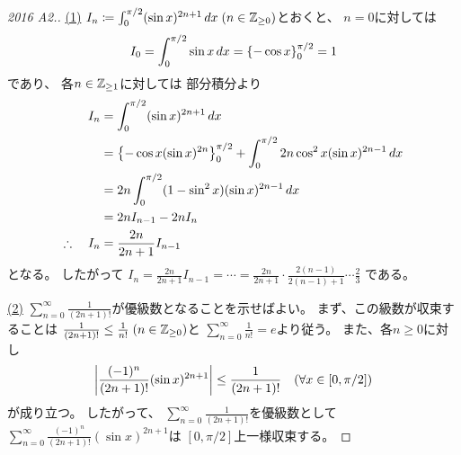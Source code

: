 \documentclass[report]{jlreq}
\begin{document}
\begin{proof}[2016 A2.]
    \uline{(1)} \quad
    $I_n \coloneqq \int_0^{\pi / 2} (\sin x)^{2n + 1} \, dx \; (n \in \mathbb{Z}_{\ge 0})$とおくと、
    $n = 0$に対しては
    \begin{equation}
        I_0 = \int_0^{\pi / 2} \sin x \, dx
            = \left\{{ - \cos x }\right\}_0^{\pi / 2}
            = 1
    \end{equation}
    であり、
    各$n \in \mathbb{Z}_{\ge 1}$に対しては
    部分積分より
    \begin{alignat}{1}
        I_n
            &=
                \int_0^{\pi / 2} (\sin x)^{2n + 1} \, dx
                \\
            &=
                \left\{{
                    - \cos x (\sin x)^{2n}
                }\right\}_0^{\pi / 2}
                +
                \int_0^{\pi / 2} 2n \cos^2 x (\sin x)^{2n - 1} \, dx
                \\
            &=
                2n \int_0^{\pi / 2} (1 - \sin^2 x) (\sin x)^{2n - 1} \, dx
                \\
            &=
                2n I_{n - 1} - 2n I_n
                \\
        \therefore \quad
        I_n
            &=
                \frac{2n}{2n + 1} I_{n - 1}
    \end{alignat}
    となる。
    したがって
    $I_n
        =
            \frac{2n}{2n + 1} I_{n - 1}
        =
            \cdots
        =
            \frac{2n}{2n + 1} \cdot \frac{2(n - 1)}{2(n - 1) + 1} \cdots \frac{2}{3}$
    である。

    \uline{(2)} \quad
    $\sum_{n = 0}^\infty \frac{1}{(2n + 1)!}$が優級数となることを示せばよい。
    まず、この級数が収束することは
    $\frac{1}{(2n + 1)!} \le \frac{1}{n!} \; (n \in \mathbb{Z}_{\ge 0})$と
    $\sum_{n = 0}^\infty \frac{1}{n!} = e$より従う。
    また、各$n \ge 0$に対し
    \begin{equation}
        \left|{
            \frac{(-1)^n}{(2n + 1)!}
            (\sin x)^{2n + 1}
        }\right|
            \le
                \frac{1}{(2n + 1)!}
                \quad
                (\forall x \in [0, \pi / 2])
    \end{equation}
    が成り立つ。
    したがって、
    $\sum_{n = 0}^\infty \frac{1}{(2n + 1)!}$を優級数として
    $\sum_{n = 0}^\infty \frac{(-1)^n}{(2n + 1)!} (\sin x)^{2n + 1}$は
    $[0, \pi / 2]$上一様収束する。


\end{proof}
\end{document}
